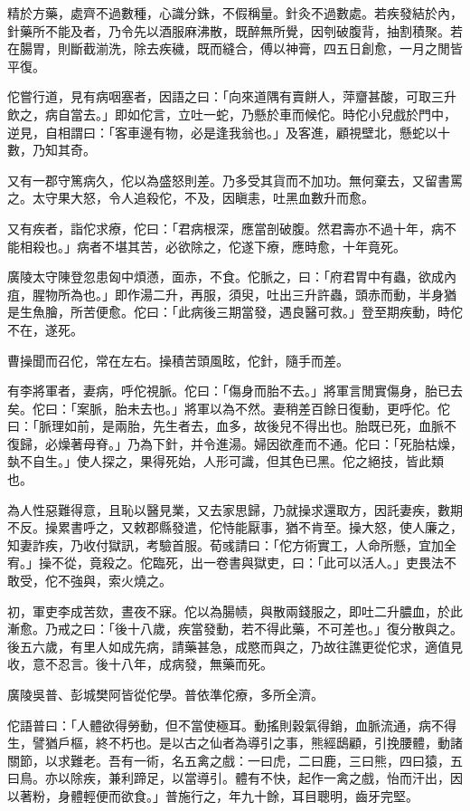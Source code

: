 \begin{pinyinscope}
精於方藥，處齊不過數種，心識分銖，不假稱量。針灸不過數處。若疾發結於內，針藥所不能及者，乃令先以酒服麻沸散，既醉無所覺，因刳破腹背，抽割積聚。若在腸胃，則斷截湔洗，除去疾穢，既而縫合，傅以神膏，四五日創愈，一月之閒皆平復。

佗嘗行道，見有病咽塞者，因語之曰：「向來道隅有賣餅人，萍齏甚酸，可取三升飲之，病自當去。」即如佗言，立吐一蛇，乃懸於車而候佗。時佗小兒戲於門中，逆見，自相謂曰：「客車邊有物，必是逢我翁也。」及客進，顧視壁北，懸蛇以十數，乃知其奇。

又有一郡守篤病久，佗以為盛怒則差。乃多受其貨而不加功。無何棄去，又留書罵之。太守果大怒，令人追殺佗，不及，因瞋恚，吐黑血數升而愈。

又有疾者，詣佗求療，佗曰：「君病根深，應當剖破腹。然君壽亦不過十年，病不能相殺也。」病者不堪其苦，必欲除之，佗遂下療，應時愈，十年竟死。

廣陵太守陳登忽患匈中煩懣，面赤，不食。佗脈之，曰：「府君胃中有蟲，欲成內疽，腥物所為也。」即作湯二升，再服，須臾，吐出三升許蟲，頭赤而動，半身猶是生魚膾，所苦便愈。佗曰：「此病後三期當發，遇良醫可救。」登至期疾動，時佗不在，遂死。

曹操聞而召佗，常在左右。操積苦頭風眩，佗針，隨手而差。

有李將軍者，妻病，呼佗視脈。佗曰：「傷身而胎不去。」將軍言閒實傷身，胎已去矣。佗曰：「案脈，胎未去也。」將軍以為不然。妻稍差百餘日復動，更呼佗。佗曰：「脈理如前，是兩胎，先生者去，血多，故後兒不得出也。胎既已死，血脈不復歸，必燥著母脊。」乃為下針，并令進湯。婦因欲產而不通。佗曰：「死胎枯燥，埶不自生。」使人探之，果得死始，人形可識，但其色已黑。佗之絕技，皆此類也。

為人性惡難得意，且恥以醫見業，又去家思歸，乃就操求還取方，因託妻疾，數期不反。操累書呼之，又敕郡縣發遣，佗恃能厭事，猶不肯至。操大怒，使人廉之，知妻詐疾，乃收付獄訊，考驗首服。荀彧請曰：「佗方術實工，人命所懸，宜加全宥。」操不從，竟殺之。佗臨死，出一卷書與獄吏，曰：「此可以活人。」吏畏法不敢受，佗不強與，索火燒之。

初，軍吏李成苦欬，晝夜不寐。佗以為腸帻，與散兩錢服之，即吐二升膿血，於此漸愈。乃戒之曰：「後十八歲，疾當發動，若不得此藥，不可差也。」復分散與之。後五六歲，有里人如成先病，請藥甚急，成愍而與之，乃故往譙更從佗求，適值見收，意不忍言。後十八年，成病發，無藥而死。

廣陵吳普、彭城樊阿皆從佗學。普依準佗療，多所全濟。

佗語普曰：「人體欲得勞動，但不當使極耳。動搖則穀氣得銷，血脈流通，病不得生，譬猶戶樞，終不朽也。是以古之仙者為導引之事，熊經鴟顧，引挽腰體，動諸關節，以求難老。吾有一術，名五禽之戲：一曰虎，二曰鹿，三曰熊，四曰猿，五曰鳥。亦以除疾，兼利蹄足，以當導引。體有不快，起作一禽之戲，怡而汗出，因以著粉，身體輕便而欲食。」普施行之，年九十餘，耳目聰明，齒牙完堅。


\end{pinyinscope}
